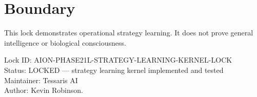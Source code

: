 \documentclass[11pt,a4paper]{article}
\begin{document}
\section{Boundary}

This lock demonstrates operational strategy learning. It does not prove general intelligence or biological consciousness.

\bigskip

\noindent
Lock ID: AION-PHASE21L-STRATEGY-LEARNING-KERNEL-LOCK\\
Status: LOCKED --- strategy learning kernel implemented and tested\\
Maintainer: Tessaris AI\\
Author: Kevin Robinson.
\end{document}
